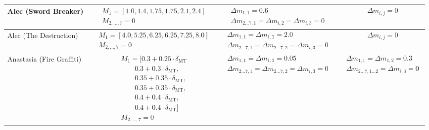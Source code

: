 \documentclass[twocolumn,10pt]{article}
\begin{document}
\begin{landscape}
\begin{longtable}{lccc}
Alec (Sword Breaker) &
$\begin{aligned}
& M_1 = [1.0, 1.4, 1.75, 1.75, 2.1, 2.4] \\
& M_{2,\ldots,7} = 0
\end{aligned}$ &
$\begin{aligned}
& \Delta m_{1,1} = 0.6 \\
& \Delta m_{2\dots7, 1} = \Delta m_{i,2} = \Delta m_{i,3} = 0

\end{aligned}$ &
$\begin{aligned}
& \Delta m_{i,j} = 0
\end{aligned}$ \\
\midrule

Alec (The Destruction) &
$\begin{aligned}
& M_1 = [4.0, 5.25, 6.25, 6.25, 7.25, 8.0] \\
& M_{2,\dots,7} = 0
\end{aligned}$ &
$\begin{aligned}
& \Delta m_{1,1} = \Delta m_{1,2} = 2.0 \\
& \Delta m_{2\dots7, 1} = \Delta m_{2\dots7, 2} = \Delta m_{i,3} = 0
\end{aligned}$ &
$\begin{aligned}
& \Delta m_{i,j} = 0
\end{aligned}$ \\
\midrule

Anastasia (Fire Graffiti) &
$\begin{aligned}
& M_1 = [0.3 + 0.25 \cdot \delta_\text{MT}\\
& \qquad 0.3 + 0.3 \cdot \delta_\text{MT},\\
& \qquad 0.35 + 0.35 \cdot \delta_\text{MT},\\
& \qquad 0.35 + 0.35 \cdot \delta_\text{MT},\\
& \qquad 0.4 + 0.4 \cdot \delta_\text{MT},\\
& \qquad 0.4 + 0.4 \cdot \delta_\text{MT}] \\
& M_{2,\dots,7} = 0
\end{aligned}$ &
$\begin{aligned}
& \Delta m_{1,1} = \Delta m_{1,2} = 0.05 \\
& \Delta m_{2\dots7, 1} = \Delta m_{2\dots7, 2}= \Delta m_{i,3} = 0
\end{aligned}$ &
$\begin{aligned}
& \Delta m_{1,1} = \Delta m_{1,2} = 0.3 \\
& \Delta m_{2\dots7, 1\dots2} = \Delta m_{i,3} = 0
\end{aligned}$ \\
\midrule


\end{longtable}
\end{landscape}
\end{document}

